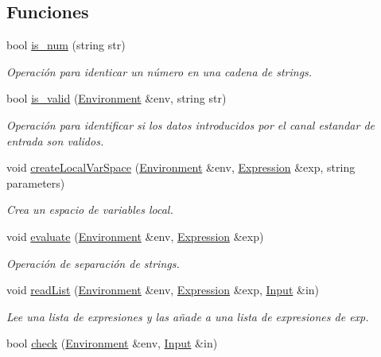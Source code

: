\subsection*{Funciones}
\begin{DoxyCompactItemize}
\item 
bool \hyperlink{_functions_i_o_8hh_ae6062008fb1c70242c967349d6ee0f9b}{is\+\_\+num} (string str)
\begin{DoxyCompactList}\small\item\em Operación para identicar un número en una cadena de strings. \end{DoxyCompactList}\item 
bool \hyperlink{_functions_i_o_8hh_a9ef0154c2cb7ee5236239fcee8333acb}{is\+\_\+valid} (\hyperlink{class_environment}{Environment} \&env, string str)
\begin{DoxyCompactList}\small\item\em Operación para identificar si los datos introducidos por el canal estandar de entrada son validos. \end{DoxyCompactList}\item 
void \hyperlink{_functions_i_o_8hh_a77ed86fa2fad279d440800e10d0f4a9a}{create\+Local\+Var\+Space} (\hyperlink{class_environment}{Environment} \&env, \hyperlink{class_expression}{Expression} \&exp, string parameters)
\begin{DoxyCompactList}\small\item\em Crea un espacio de variables local. \end{DoxyCompactList}\item 
void \hyperlink{_functions_i_o_8hh_ad4d84fbc6c7e89fb6c14869a204e0913}{evaluate} (\hyperlink{class_environment}{Environment} \&env, \hyperlink{class_expression}{Expression} \&exp)
\begin{DoxyCompactList}\small\item\em Operación de separación de strings. \end{DoxyCompactList}\item 
void \hyperlink{_functions_i_o_8hh_aa35945b371ae9ece372fe0a7c8e97aee}{read\+List} (\hyperlink{class_environment}{Environment} \&env, \hyperlink{class_expression}{Expression} \&exp, \hyperlink{class_input}{Input} \&in)
\begin{DoxyCompactList}\small\item\em Lee una lista de expresiones y las añade a una lista de expresiones de exp. \end{DoxyCompactList}\item 
bool \hyperlink{_functions_i_o_8hh_a52044451543aacd73dad0b1bdfb9c0bd}{check} (\hyperlink{class_environment}{Environment} \&env, \hyperlink{class_input}{Input} \&in)

\end{DoxyCompactItemize}

